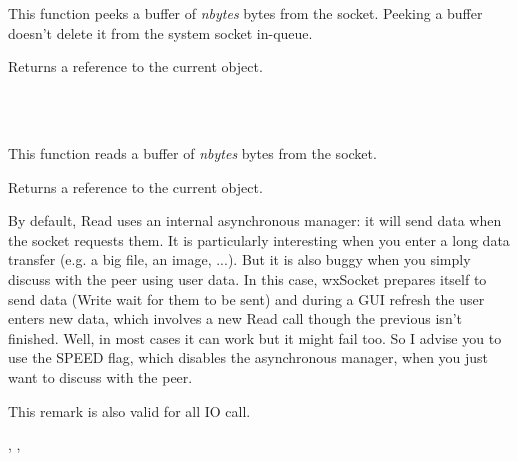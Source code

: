 This function peeks a buffer of {\it nbytes} bytes from the socket. Peeking a buffer
doesn't delete it from the system socket in-queue.





Returns a reference to the current object.


\\
\\

%
%
\label{wxsocketbaseread}


This function reads a buffer of {\it nbytes} bytes from the socket.





Returns a reference to the current object.


By default, Read uses an internal asynchronous manager: it will send data when
the socket requests them. It is particularly interesting when you enter a long
data transfer (e.g. a big file, an image, ...). But it is also buggy when you
simply discuss with the peer using user data. In this case, wxSocket prepares
itself to send data (Write wait for them to be sent) and during a GUI refresh
the user enters new data, which involves a new Read call though the previous
isn't finished. Well, in most cases it can work but it might fail too.
So I advise you to use the SPEED flag, which disables the asynchronous manager,
when you just want to discuss with the peer.

This remark is also valid for all IO call.


,
 ,

